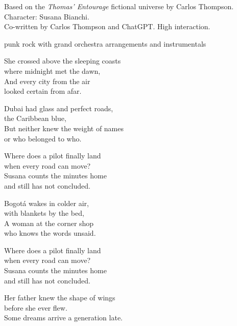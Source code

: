 

\begin{notes}
Based on the \emph{Thomas’ Entourage} fictional universe by Carlos Thompson.\\
Character: Susana Bianchi.\\
Co-written by Carlos Thompson and ChatGPT. %
High interaction.
\end{notes}

\begin{style}
punk rock with grand orchestra arrangements and instrumentals 
\end{style}

\begin{lyrics}

She crossed above the sleeping coasts\\
where midnight met the dawn,\\
And every city from the air\\
looked certain from afar.

Dubai had glass and perfect roads,\\
the Caribbean blue,\\
But neither knew the weight of names\\
or who belonged to who.

Where does a pilot finally land\\
when every road can move?\\
Susana counts the minutes home\\
and still has not concluded.

Bogotá wakes in colder air,\\
with blankets by the bed,\\
A woman at the corner shop\\
who knows the words unsaid.

Where does a pilot finally land\\
when every road can move?\\
Susana counts the minutes home\\
and still has not concluded.

Her father knew the shape of wings\\
before she ever flew.\\
Some dreams arrive a generation late.


\end{lyrics}
